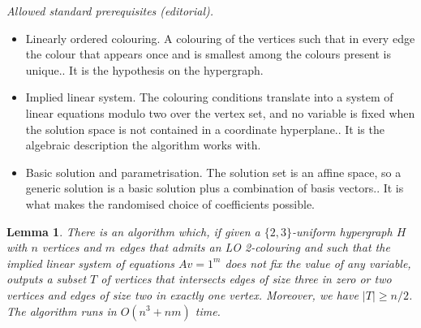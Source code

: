 \documentclass[10pt,a4paper]{article}
\theoremstyle{plain}
\newtheorem{lemma}[theorem]{Lemma}
\theoremstyle{definition}
\begin{document}
\noindent\textit{Allowed standard prerequisites (editorial).}\begin{itemize}
\item Linearly ordered colouring. A colouring of the vertices such that in every edge the colour that appears once and is smallest among the colours present is unique.. It is the hypothesis on the hypergraph.
\item Implied linear system. The colouring conditions translate into a system of linear equations modulo two over the vertex set, and no variable is fixed when the solution space is not contained in a coordinate hyperplane.. It is the algebraic description the algorithm works with.
\item Basic solution and parametrisation. The solution set is an affine space, so a generic solution is a basic solution plus a combination of basis vectors.. It is what makes the randomised choice of coefficients possible.
\end{itemize}\medskip
\begin{lemma}\label{lem:innerstep}
    There is an algorithm which, if given a $\{2, 3\}$-uniform hypergraph $H$ with $n$ vertices and
    $m$ edges that admits an LO 2-colouring and such that the implied linear
    system of equations $Av=1^m$ does not fix the value of any variable, outputs a subset $T$ of vertices that intersects edges of size three in zero or two vertices and edges of size two in exactly one vertex.
    Moreover, we have  $\vert T\vert \geq n / 2$. The algorithm runs in $O(n^3 + nm)$ time.
\end{lemma}
\end{document}
